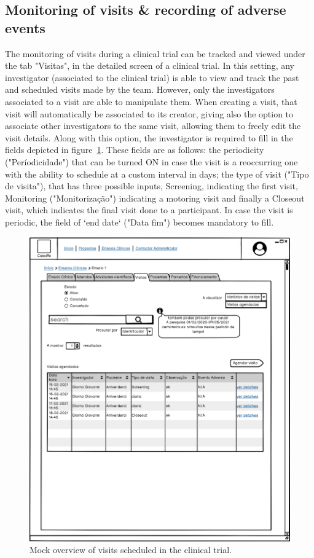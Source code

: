 \subsection{Monitoring of visits \& recording of adverse events} 
The monitoring of visits during a clinical trial can be tracked and viewed under the tab "Visitas", in the detailed screen of a clinical trial.
In this setting, any investigator (associated to the clinical trial) is able to view and track the past and scheduled visits made by the team. However, only the investigators associated to a visit are able to manipulate them. When creating a visit, that visit will automatically be associated to its creator, giving also the option to associate other investigators to the same visit, allowing them to freely edit the visit details. Along with this option, the investigator is required to fill in the fields depicted in figure~\ref{fig:ensaio-visitas}. These fields are as follows: the periodicity ("Períodicidade") that can be turned ON in case the visit is a reoccurring one with the ability to schedule at a custom interval in days; the type of visit ("Tipo de visita"), that has three possible inputs, Screening, indicating the first visit, Monitoring ("Monitorização") indicating a motoring visit and finally a Closeout visit, which indicates the final visit done to a participant. In case the visit is periodic, the field of `end date` ("Data fim") becomes mandatory to fill.  

\begin{figure}[H]
    \centering
    \includegraphics[scale=0.35]{Chapters/img/ensaios/ensaio-visitas.png}
    \caption{Mock overview of visits scheduled in the clinical trial.}
    \label{fig:ensaio-visitas}
\end{figure}

